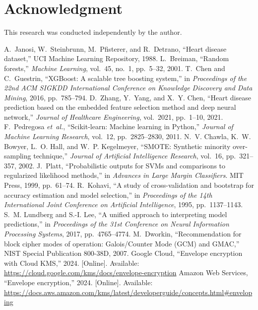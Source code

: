 \documentclass[12pt]{article}
\begin{document}
  \section*{Acknowledgment}
  This research was conducted independently by the author.
\newpage
\newpage
\newpage
\newpage
\newpage
\newpage
\newpage
\newpage
\newpage
\begin{thebibliography}{00}
 A.~Janosi, W.~Steinbrunn, M.~Pfisterer, and R.~Detrano, ``Heart disease dataset,'' UCI Machine Learning Repository, 1988.
 L.~Breiman, ``Random forests,'' \emph{Machine Learning}, vol.~45, no.~1, pp.~5--32, 2001.
 T.~Chen and C.~Guestrin, ``XGBoost: A scalable tree boosting system,'' in \emph{Proceedings of the 22nd ACM SIGKDD International Conference on Knowledge Discovery and Data Mining}, 2016, pp.~785--794.
 D.~Zhang, Y.~Yang, and X.~Y. Chen, ``Heart disease prediction based on the embedded feature selection method and deep neural network,'' \emph{Journal of Healthcare Engineering}, vol.~2021, pp.~1--10, 2021.
 F.~Pedregosa \emph{et~al.}, ``Scikit-learn: Machine learning in Python,'' \emph{Journal of Machine Learning Research}, vol.~12, pp.~2825--2830, 2011.
 N.~V. Chawla, K.~W. Bowyer, L.~O. Hall, and W.~P. Kegelmeyer, ``SMOTE: Synthetic minority over-sampling technique,'' \emph{Journal of Artificial Intelligence Research}, vol.~16, pp.~321--357, 2002.
 J.~Platt, ``Probabilistic outputs for SVMs and comparisons to regularized likelihood methods,'' in \emph{Advances in Large Margin Classifiers}. MIT Press, 1999, pp.~61--74.
 R.~Kohavi, ``A study of cross-validation and bootstrap for accuracy estimation and model selection,'' in \emph{Proceedings of the 14th International Joint Conference on Artificial Intelligence}, 1995, pp.~1137--1143.
 S.~M. Lundberg and S.-I. Lee, ``A unified approach to interpreting model predictions,'' in \emph{Proceedings of the 31st Conference on Neural Information Processing Systems}, 2017, pp.~4765--4774.
 M.~Dworkin, ``Recommendation for block cipher modes of operation: Galois/Counter Mode (GCM) and GMAC,'' NIST Special Publication 800-38D, 2007.
 Google Cloud, ``Envelope encryption with Cloud KMS,'' 2024. [Online]. Available: \url{https://cloud.google.com/kms/docs/envelope-encryption}
 Amazon Web Services, ``Envelope encryption,'' 2024. [Online]. Available: \url{https://docs.aws.amazon.com/kms/latest/developerguide/concepts.html#enveloping}

\end{thebibliography}
\end{document}
